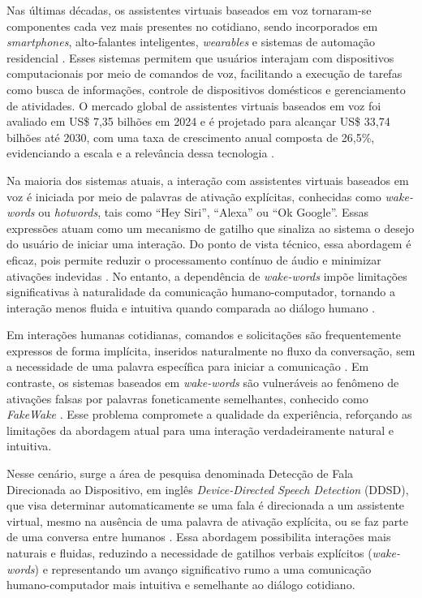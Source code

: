 \documentclass[
    12pt,                %
    openright,           %
    oneside,             %
    a4paper,             %
    english,             %
    brazil               %
]{abntex2}
\begin{document}
Nas últimas décadas, os assistentes virtuais baseados em voz tornaram-se componentes cada vez mais presentes no cotidiano, sendo incorporados em \textit{smartphones}, alto-falantes inteligentes, \textit{wearables} e sistemas de automação residencial \cite{Jurafsky2024}. Esses sistemas permitem que usuários interajam com dispositivos computacionais por meio de comandos de voz, facilitando a execução de tarefas como busca de informações, controle de dispositivos domésticos e gerenciamento de atividades. O mercado global de assistentes virtuais baseados em voz foi avaliado em US\$ 7,35 bilhões em 2024 e é projetado para alcançar US\$ 33,74 bilhões até 2030, com uma taxa de crescimento anual composta de 26,5\%, evidenciando a escala e a relevância dessa tecnologia \cite{NMSC2025}.

Na maioria dos sistemas atuais, a interação com assistentes virtuais baseados em voz é iniciada por meio de palavras de ativação explícitas, conhecidas como \textit{wake-words} ou \textit{hotwords}, tais como ``Hey Siri'', ``Alexa'' ou ``Ok Google''. Essas expressões atuam como um mecanismo de gatilho que sinaliza ao sistema o desejo do usuário de iniciar uma interação. Do ponto de vista técnico, essa abordagem é eficaz, pois permite reduzir o processamento contínuo de áudio e minimizar ativações indevidas \cite{Garg2021}. No entanto, a dependência de \textit{wake-words} impõe limitações significativas à naturalidade da comunicação humano-computador, tornando a interação menos fluida e intuitiva quando comparada ao diálogo humano \cite{Nie2021}.

Em interações humanas cotidianas, comandos e solicitações são frequentemente expressos de forma implícita, inseridos naturalmente no fluxo da conversação, sem a necessidade de uma palavra específica para iniciar a comunicação \cite{Weld2022}. Em contraste, os sistemas baseados em \textit{wake-words} são vulneráveis ao fenômeno de ativações falsas por palavras foneticamente semelhantes, conhecido como \textit{FakeWake} \cite{Chen2021}. Esse problema compromete a qualidade da experiência, reforçando as limitações da abordagem atual para uma interação verdadeiramente natural e intuitiva.

Nesse cenário, surge a área de pesquisa denominada Detecção de Fala Direcionada ao Dispositivo, em inglês \textit{Device-Directed Speech Detection} (DDSD), que visa determinar automaticamente se uma fala é direcionada a um assistente virtual, mesmo na ausência de uma palavra de ativação explícita, ou se faz parte de uma conversa entre humanos \cite{Mallidi2018, Wagner2024}. Essa abordagem possibilita interações mais naturais e fluidas, reduzindo a necessidade de gatilhos verbais explícitos (\textit{wake-words}) e representando um avanço significativo rumo a uma comunicação humano-computador mais intuitiva e semelhante ao diálogo cotidiano.
\end{document}
